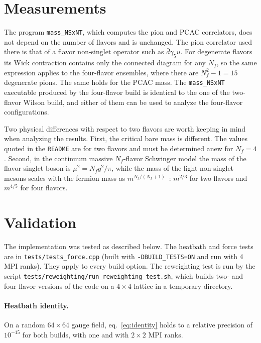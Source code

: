 \documentclass[11pt,a4paper]{article}
\newcommand{\Nf}{N_f}
\newcommand{\code}[1]{\texttt{#1}}
\begin{document}
\section{Measurements}
\label{sec:measurements}

The program \code{mass\_NSxNT}, which computes the pion and PCAC correlators, does not depend on the number of
flavors and is unchanged. The pion correlator used there is that of a flavor non-singlet operator such as
$\bar d\gamma_5 u$. For degenerate flavors its Wick contraction contains only the connected diagram for any $\Nf$,
so the same expression applies to the four-flavor ensembles, where there are $\Nf^2-1 = 15$ degenerate pions. The
same holds for the PCAC mass. The \code{mass\_NSxNT} executable produced by the four-flavor build is identical to
the one of the two-flavor Wilson build, and either of them can be used to analyze the four-flavor configurations.

Two physical differences with respect to two flavors are worth keeping in mind when analyzing the results. First,
the critical bare mass is different. The values quoted in the \code{README} are for two flavors and must be
determined anew for $\Nf = 4$. Second, in the continuum massive $\Nf$-flavor Schwinger model the mass of the
flavor-singlet boson is $\mu^2 = \Nf g^2/\pi$, while the mass of the light non-singlet mesons scales with the
fermion mass as $m^{\Nf/(\Nf+1)}$~\cite{Coleman1976,Hetrick1995}: $m^{2/3}$ for two flavors and $m^{4/5}$ for four
flavors.

\section{Validation}
\label{sec:validation}

The implementation was tested as described below. The heatbath and force tests are in \code{tests/tests\_force.cpp}
(built with \code{-DBUILD\_TESTS=ON} and run with 4 MPI ranks). They apply to every build option. The reweighting test
is run by the script \texttt{\nolinkurl{tests/reweighting/run_reweighting_test.sh}}, which builds two- and four-flavor versions of the code on
a $4\times4$ lattice in a temporary directory.

\paragraph{Heatbath identity.}
On a random $64\times64$ gauge field, eq.~\eqref{eq:identity} holds to a relative precision of $10^{-15}$ for both
builds, with one and with $2\times2$ MPI ranks.
\end{document}
